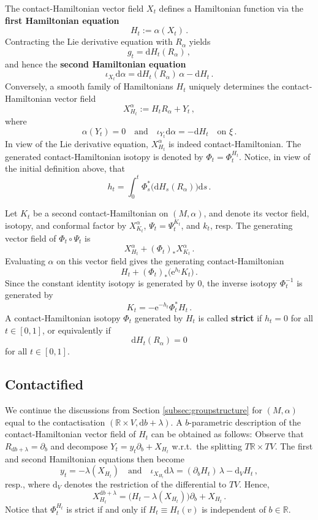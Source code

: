 \documentclass{amsart}
\theoremstyle{definition}
\newcommand{\rmd}{\mathrm d}
\newcommand{\rme}{\mathrm e}
\newcommand{\R}{\mathbb R}
\begin{document}
The contact-Hamiltonian vector field $X_t$
defines a Hamiltonian function
via the {\bf first Hamiltonian equation}
\[
H_t:=\alpha(X_t)
\,.
\]
Contracting the Lie derivative equation with
$R_{\alpha}$ yields
\[
g_t=\rmd H_t(R_{\alpha})
\,,
\]
and hence the {\bf second Hamiltonian equation}
\[
\iota_{X_t}\rmd\alpha
=
\rmd H_t(R_{\alpha})\,\alpha-\rmd H_t
\,.
\]
Conversely, a smooth family of Hamiltonians $H_t$
uniquely determines the contact-Hamiltonian vector field
\[
X_{\!H_t}^{\alpha}:=H_tR_{\alpha}+Y_t
\,,
\]
where
\[
\alpha(Y_t)=0
\quad\text{and}\quad
\iota_{Y_t}\rmd\alpha=-\rmd H_t
\quad\text{on }\xi
\,.
\]
In view of the Lie derivative equation,
$X_{\!H_t}^{\alpha}$ is indeed contact-Hamiltonian.
The generated contact-Hamiltonian isotopy
is denoted by $\Phi_t=\Phi_t^{H_t}$.
Notice, in view of the initial definition above, that
\[
h_t=\int_0^t\Phi_s^*\big(\rmd H_s(R_{\alpha})\big)\rmd s
\,.
\]

Let $K_t$ be a second contact-Hamiltonian on $(M,\alpha)$,
and denote its vector field, isotopy, and conformal factor by
$X_{\!K_t}^{\alpha}$, $\Psi_t=\Psi_t^{K_t}$, and $k_t$,
resp.
The generating vector field of
$\Phi_t\circ\Psi_t$ is
\[
X_{\!H_t}^{\alpha}
+
(\Phi_t)_*X_{\!K_t}^{\alpha}
\,.
\]
Evaluating $\alpha$ on this vector field gives
the generating contact-Hamiltonian
\[
H_t+(\Phi_t)_*\bigl(\rme^{h_t}K_t\bigr)
\,.
\]
Since the constant identity isotopy is generated by $0$,
the inverse isotopy $\Phi_t^{-1}$ is generated by
\[
K_t=-\rme^{-h_t}\Phi_t^*H_t
\,.
\]
A contact-Hamiltonian isotopy $\Phi_t$ generated by $H_t$
is called {\bf strict} if $h_t=0$ for all $t\in[0,1]$,
or equivalently if
\[
\rmd H_t(R_{\alpha})=0
\]
for all $t\in[0,1]$.



\subsection{Contactified}
\label{subsec:contactified}


We continue the discussions from Section \ref{subsec:groupstructure}
for $(M,\alpha)$ equal to the contactisation
$(\R\times V,\rmd b+\lambda)$.
A $b$-parametric description
of the contact-Hamiltonian vector field of $H_t$
can be obtained as follows:
Observe that
$R_{\rmd b+\lambda}=\partial_b$
and decompose
$Y_t=y_t\partial_b+X_{H_t}$
w.r.t.\ the splitting $T\R\times TV$.
The first and second Hamiltonian equations then become
\[
y_t=-\lambda(X_{H_t})
\quad\text{and}\quad
\iota_{X_{H_t}}\rmd\lambda
=
(\partial_bH_t)\,\lambda-\rmd_VH_t
\,,
\]
resp., where $\rmd_V$ denotes the restriction
of the differential to $TV$.
Hence,
\[
X_{H_t}^{\rmd b+\lambda}
=
\big(H_t-\lambda(X_{H_t})\big)\partial_b+X_{H_t}
\,.
\]
Notice that $\Phi_t^{H_t}$ is strict
if and only if $H_t\equiv H_t(v)$
is independent of $b\in\R$.
\end{document}
